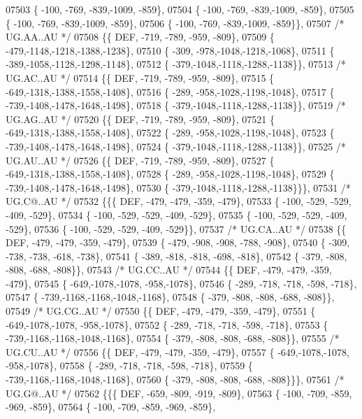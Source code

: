 \begin{DoxyCode}
07503 \{ -100, -769, -839,-1009, -859\},
07504 \{ -100, -769, -839,-1009, -859\},
07505 \{ -100, -769, -839,-1009, -859\},
07506 \{ -100, -769, -839,-1009, -859\}\},
07507 \textcolor{comment}{/* UG.AA..AU */}
07508 \{\{  DEF, -719, -789, -959, -809\},
07509 \{ -479,-1148,-1218,-1388,-1238\},
07510 \{ -309, -978,-1048,-1218,-1068\},
07511 \{ -389,-1058,-1128,-1298,-1148\},
07512 \{ -379,-1048,-1118,-1288,-1138\}\},
07513 \textcolor{comment}{/* UG.AC..AU */}
07514 \{\{  DEF, -719, -789, -959, -809\},
07515 \{ -649,-1318,-1388,-1558,-1408\},
07516 \{ -289, -958,-1028,-1198,-1048\},
07517 \{ -739,-1408,-1478,-1648,-1498\},
07518 \{ -379,-1048,-1118,-1288,-1138\}\},
07519 \textcolor{comment}{/* UG.AG..AU */}
07520 \{\{  DEF, -719, -789, -959, -809\},
07521 \{ -649,-1318,-1388,-1558,-1408\},
07522 \{ -289, -958,-1028,-1198,-1048\},
07523 \{ -739,-1408,-1478,-1648,-1498\},
07524 \{ -379,-1048,-1118,-1288,-1138\}\},
07525 \textcolor{comment}{/* UG.AU..AU */}
07526 \{\{  DEF, -719, -789, -959, -809\},
07527 \{ -649,-1318,-1388,-1558,-1408\},
07528 \{ -289, -958,-1028,-1198,-1048\},
07529 \{ -739,-1408,-1478,-1648,-1498\},
07530 \{ -379,-1048,-1118,-1288,-1138\}\}\},
07531 \textcolor{comment}{/* UG.C@..AU */}
07532 \{\{\{  DEF, -479, -479, -359, -479\},
07533 \{ -100, -529, -529, -409, -529\},
07534 \{ -100, -529, -529, -409, -529\},
07535 \{ -100, -529, -529, -409, -529\},
07536 \{ -100, -529, -529, -409, -529\}\},
07537 \textcolor{comment}{/* UG.CA..AU */}
07538 \{\{  DEF, -479, -479, -359, -479\},
07539 \{ -479, -908, -908, -788, -908\},
07540 \{ -309, -738, -738, -618, -738\},
07541 \{ -389, -818, -818, -698, -818\},
07542 \{ -379, -808, -808, -688, -808\}\},
07543 \textcolor{comment}{/* UG.CC..AU */}
07544 \{\{  DEF, -479, -479, -359, -479\},
07545 \{ -649,-1078,-1078, -958,-1078\},
07546 \{ -289, -718, -718, -598, -718\},
07547 \{ -739,-1168,-1168,-1048,-1168\},
07548 \{ -379, -808, -808, -688, -808\}\},
07549 \textcolor{comment}{/* UG.CG..AU */}
07550 \{\{  DEF, -479, -479, -359, -479\},
07551 \{ -649,-1078,-1078, -958,-1078\},
07552 \{ -289, -718, -718, -598, -718\},
07553 \{ -739,-1168,-1168,-1048,-1168\},
07554 \{ -379, -808, -808, -688, -808\}\},
07555 \textcolor{comment}{/* UG.CU..AU */}
07556 \{\{  DEF, -479, -479, -359, -479\},
07557 \{ -649,-1078,-1078, -958,-1078\},
07558 \{ -289, -718, -718, -598, -718\},
07559 \{ -739,-1168,-1168,-1048,-1168\},
07560 \{ -379, -808, -808, -688, -808\}\}\},
07561 \textcolor{comment}{/* UG.G@..AU */}
07562 \{\{\{  DEF, -659, -809, -919, -809\},
07563 \{ -100, -709, -859, -969, -859\},
07564 \{ -100, -709, -859, -969, -859\},

\end{DoxyCode}
